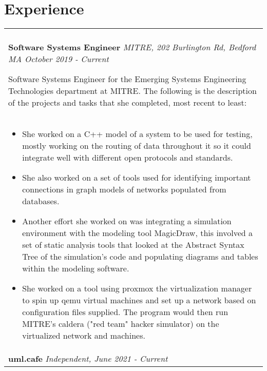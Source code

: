 \documentclass[11pt]{article}
\begin{document}
\section*{Experience}
\begin{tabular}{p{18.5cm}}
    \hline
    \multicolumn{1}{c}{} \\

    \large \textbf{Software Systems Engineer} \normalsize \textit{MITRE, 202 Burlington Rd, Bedford MA \hfill October 2019 - Current}

    \> Software Systems Engineer for the Emerging Systems Engineering Technologies department at MITRE. The following is the 
    description of the projects and tasks that she completed, most recent to least:\\ 

    \begin{itemize}[noitemsep,topsep=0pt]
      \item She worked on a C++ model of a system to be used for testing, mostly working on the routing of data throughout it so it could 
      integrate well with different open protocols and standards.
      \item She also worked on a set of tools used for identifying important connections in graph models of networks populated from databases.
      \item Another effort she worked on was integrating a simulation environment with the modeling tool MagicDraw, this involved 
      a set of static analysis tools that looked at the Abstract Syntax Tree of the simulation's code and populating diagrams and 
      tables within the modeling software.
      \item She worked on a tool using proxmox the virtualization manager to spin up qemu virtual machines and 
      set up a network based on configuration files supplied. The program would then run MITRE's caldera ("red team" hacker simulator) on 
      the virtualized network and machines.
    \end{itemize}\\

    \large \textbf{uml.cafe} \normalsize \textit{Independent, \hfill June 2021 - Current}


\end{tabular}
\end{document}
